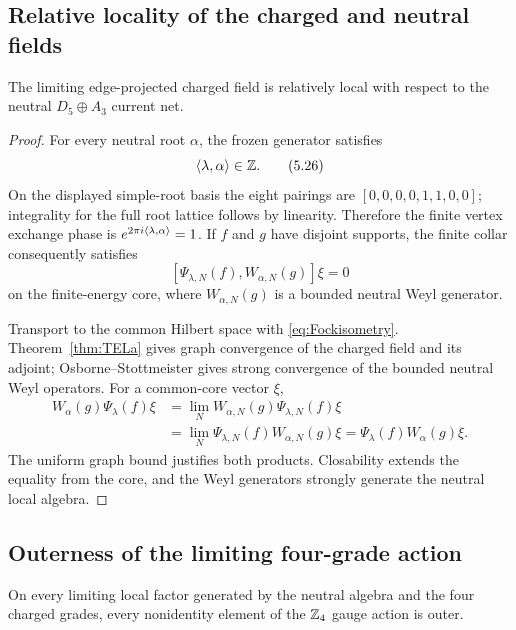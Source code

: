 \subsection{Relative locality of the charged and neutral fields}

\begin{theorem}
\label{thm:relativeLocality}
The limiting edge-projected charged field is relatively local with
respect to the neutral $D_5\oplus A_3$ current net.
\end{theorem}

\begin{proof}
For every neutral root $\alpha$, the frozen generator satisfies
\[
 \left\langle\lambda,\alpha\right\rangle\in\mathbb Z.
\tag{5.26}\label{eq:integralpairing}
\]
On the displayed simple-root basis the eight pairings are
$[0,0,0,0,1,1,0,0]$; integrality for the full root lattice follows by
linearity.  Therefore the finite vertex exchange phase is
$e^{2\pi i\left\langle\lambda,\alpha\right\rangle}=1$.  If $f$ and $g$ have disjoint
supports, the finite collar consequently satisfies
\[
 [\Psi_{\lambda,N}(f),W_{\alpha,N}(g)]\xi=0
\]
on the finite-energy core, where $W_{\alpha,N}(g)$ is a bounded neutral
Weyl generator.

Transport to the common Hilbert space with \eqref{eq:Fockisometry}.
Theorem~\ref{thm:TELa} gives graph convergence of the charged field and
its adjoint; Osborne--Stottmeister gives strong convergence of the
bounded neutral Weyl operators.  For a common-core vector $\xi$,
\[
\begin{aligned}
 W_\alpha(g)\Psi_\lambda(f)\xi
 &=\lim_NW_{\alpha,N}(g)\Psi_{\lambda,N}(f)\xi\\
 &=\lim_N\Psi_{\lambda,N}(f)W_{\alpha,N}(g)\xi
 =\Psi_\lambda(f)W_\alpha(g)\xi .
\end{aligned}
\]
The uniform graph bound justifies both products.  Closability extends
the equality from the core, and the Weyl generators strongly generate
the neutral local algebra.
\end{proof}

\subsection{Outerness of the limiting four-grade action}

\begin{theorem}
\label{thm:outerness}
On every limiting local factor generated by the neutral algebra and the
four charged grades, every nonidentity element of the $\mathbb Z_4$ gauge
action is outer.
\end{theorem}


